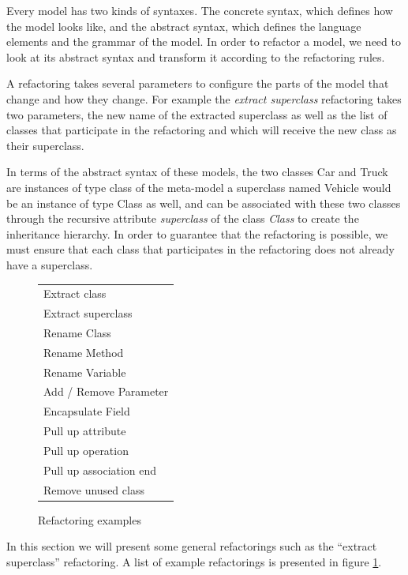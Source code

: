 \documentclass{llncs}
\begin{document}
Every model has two kinds of syntaxes. The concrete syntax, which defines how the model looks like, and the abstract
syntax, which defines the language elements and the grammar of the model. In order to refactor a model, we need to look at
its abstract syntax and transform it according to the refactoring rules.

A refactoring takes several parameters to configure the parts of the model that change and how they change. For example
the \textit{extract superclass} refactoring takes two parameters, the new name of the extracted superclass as well as
the list of classes that participate in the refactoring and which will receive the new class as their superclass.

In terms of the abstract syntax of these models, the two classes Car and Truck are instances of type class of the meta-model a 
superclass named Vehicle would be an instance of type Class as well, and can be associated with these two classes through the 
recursive attribute \textit{superclass} of the class \textit{Class} to create the inheritance hierarchy. In order to guarantee 
that the refactoring is possible, we must ensure that each class that participates in the 
refactoring does not already have a superclass.

\begin{figure}[h!t]
 \centering
 \begin{tabular}[]{l}
  \hline
  Extract class\\
  Extract superclass\\
  Rename Class\\
  Rename Method\\
  Rename Variable\\
  Add / Remove Parameter\\
  Encapsulate Field\\
  Pull up attribute\\
  Pull up operation\\
  Pull up association end\\
  Remove unused class\\
  \hline
 \end{tabular}
 \caption{Refactoring examples}
 \label{fig:refactoringlist}
\end{figure}

In this section we will present some general refactorings such as the ``extract superclass'' 
refactoring. A list of example refactorings is presented in figure \ref{fig:refactoringlist}.
\end{document}
